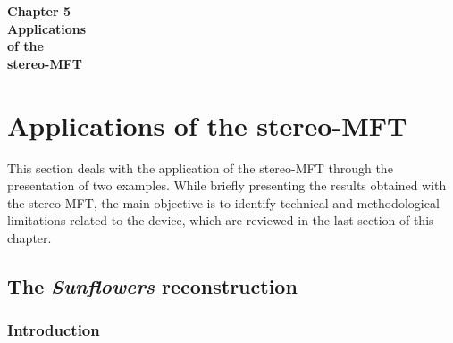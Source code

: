 


\pagecolor{mygray}

\begin{titlepage}
   \begin{center}
       \vspace*{3cm}
       {\fontsize{40pt}{46pt}\selectfont \textbf{Chapter 5}}\\       
       \vspace*{3cm}
       {\fontsize{30pt}{36pt}\selectfont \textbf{Applications}} \\[1cm]    
       {\fontsize{30pt}{36pt}\selectfont \textbf{of the}} \\[1cm]
       {\fontsize{30pt}{36pt}\selectfont \textbf{stereo-MFT}} \\ 
   \end{center}
\end{titlepage}

\restoregeometry
\pagecolor{white}


\chapter{ Applications of the stereo-MFT}
\label{ch:ch5_applications-MFT}

This section deals with the application of the stereo-MFT through the presentation of two examples. While briefly presenting the results obtained with the stereo-MFT, the main objective is to identify technical and methodological limitations related to the device, which are reviewed in the last section of this chapter.

\section{ The \textit{Sunflowers} reconstruction}

\subsection{Introduction}

